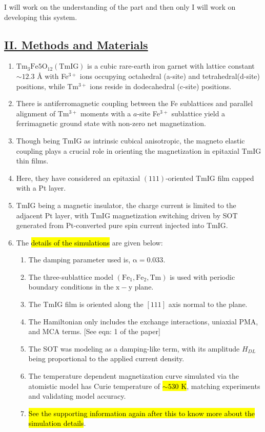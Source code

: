 I will work on the understanding of the  part and then only I will work on developing this system.
\subsection*{\centering\underline{II. Methods and Materials}}
\begin{enumerate}
    \item $\mathrm{Tm_3Fe5O_{12} (TmIG)}$ is a cubic rare-earth iron garnet  with lattice constant $\sim 12.3$ \r{A} with Fe$^{3+}$ ions occupying octahedral (a-site) and tetrahedral(d-site) positions, while Tm$^{3+}$ ions reside in dodecahedral (c-site) positions.
    \item There is antiferromagnetic coupling between the Fe sublattices and parallel alignment of Tm$^{3+}$ moments with a $a$-site Fe$^{3+}$ sublattice yield a ferrimagnetic ground state with non-zero net magnetization.
    \item Though being TmIG as intrinsic cubical anisotropic, the magneto elastic coupling plays a crucial role in orienting the magnetization in epitaxial TmIG thin films.
    \item Here, they have considered an epitaxial $(111)$-oriented TmIG film capped with a Pt layer.
    \item TmIG being a magnetic insulator, the charge current is limited to the adjacent Pt layer, with TmIG magnetization switching driven by SOT generated from Pt-converted pure spin current injected into TmIG.
    \item The \hl{details of the simulations} are given below:
    \begin{enumerate}[\ding{212}]
        \item The damping parameter used is, $\mathrm{\alpha=0.033}$.
        \item The three-sublattice model $(\mathrm{Fe_1, Fe_2, Tm})$ is used with periodic boundary conditions in the $\mathrm{x-y}$ plane.
        \item The TmIG film is oriented along the $[111]$ axis normal to the plane.
        \item The Hamiltonian only includes the exchange interactions, uniaxial PMA, and MCA terms. [See eqn: 1 of the paper]
        \item The SOT was modeling as a damping-like term, with its amplitude $H_{DL}$ being proportional to the applied current density.
        \item The temperature dependent magnetization curve simulated via the atomistic model has Curie temperature of \hl{$\sim 530$ K}, matching experiments and validating model accuracy.
        \item \hl{See the supporting information again after this to know more about the simulation details}.
    \end{enumerate}
\end{enumerate}
